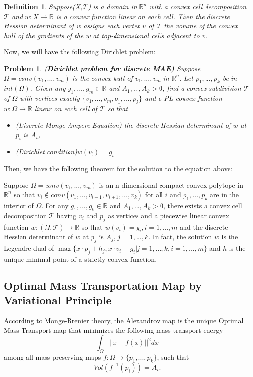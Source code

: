\documentclass[runningheads]{llncs}
\newtheorem{mydef}{Definition}
\newtheorem{mypro}{Problem}
\begin{document}
\begin{mydef}
Suppose(X,$\mathscr{T}$) is a domain in $\mathbb{R}^n$ with a convex cell decomposition $\mathscr{T}$ and $w:X\rightarrow \mathbb{R}$ is a convex function linear on each cell. Then the discrete Hessian determinant of w assigns each vertex $v$ of $\mathscr{T}$ the volume of the convex hull of the gradients of the $w$ at top-dimensional cells adjacent to $v$.
\end{mydef}
Now, we will have the following Dirichlet problem:
\begin{mypro}
\textbf{(Dirichlet problem for discrete MAE)} Suppose $\Omega=conv(v_1, ..., v_m)$ is the convex hull of $v_1,...,v_m$ in $\mathbb{R}^n$. Let $p_1,...,p_k$ be in $int(\Omega)$. Given any $g_1,...,g_m\in\mathbb{R}$ and $A_1,...,A_k>0$, find a convex subdivision $\mathscr{T}$ of $\Omega$ with vertices exactly $\{v_1,...,v_m,p_1,...,p_k\}$ and a PL convex function $w:\Omega\rightarrow \mathbb{R}$ linear on each cell of $\mathscr{T}$ so that
\begin{itemize}
\item[(a)](Discrete Monge-Ampere Equation) the discrete Hessian determinant of $w$ at $p_i$ is $A_i$,
\item[(b)](Dirichlet condition)$w(v_i)=g_i$.
\end{itemize}
\end{mypro}

Then, we have the following theorem for the solution to the equation above:

\begin{theorem}
Suppose $\Omega = conv(v_1,...,v_m)$ is an n-dimensional compact convex polytope in $\mathbb{R}^n$ so that $v_i\notin conv(v_1,...,v_{i-1},v_{i+1},...,v_k)$ for all $i$ and $p_1,...,p_k$ are in the interior of $\Omega$. For any $g_1,...,g_k\in\mathbb{R}$ and $A_1,...,A_k>0$, there exists a convex cell decomposition $\mathscr{T}$ having $v_i$ and $p_j$ as vertices and a piecewise linear convex function $w:(\Omega,\mathscr{T})\rightarrow \mathbb{R}$ so that $w(v_i)=g_i,i=1,...,m$ and the discrete Hessian determinant of $w$ at $p_j$ is $A_j$, $j=1,...,k$. In fact, the solution $w$ is the Legendre dual of $\max\{x\cdot p_j+h_j,x\cdot v_i-g_i|j=1,...,k,i=1,...,m\}$ and $h$ is the unique minimal point of a strictly convex function.
\end{theorem}




\subsection{Optimal Mass Transportation Map by Variational Principle}
According to Monge-Brenier theory\cite{brenier1991polar}, the Alexandrov map is the unique Optimal Mass Transport map that minimizes the following mass transport energy $$\int _\Omega||x-f(x)||^{2}dx$$ among all mass preserving maps $f:\Omega\rightarrow\{p_1,...,p_k\}$, such that $$ Vol(f^{-1}(p_i)) = A_i.$$
\end{document}
